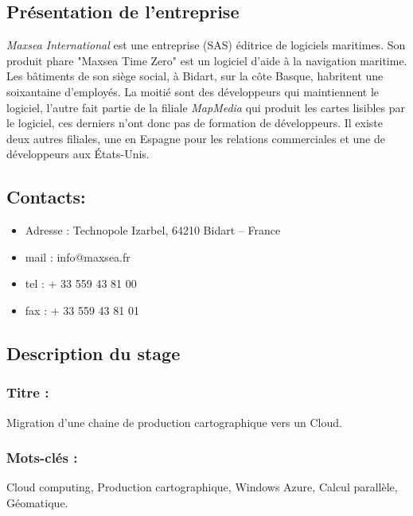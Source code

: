 
\subsection{Présentation de l'entreprise \maxsea}
\textit{Maxsea International} est une entreprise (SAS) éditrice de
logiciels maritimes. Son produit phare "Maxsea Time Zero" est un
logiciel d'aide à la navigation maritime. Les bâtiments de son siège
social, à Bidart, sur la côte Basque, habritent une soixantaine
d'employés. La moitié sont des développeurs qui maintiennent le
logiciel, l'autre fait partie de la filiale \textit{MapMedia} qui
produit les cartes lisibles par le logiciel, ces derniers n'ont donc
pas de formation de développeurs.  Il existe deux autres filiales, une
en Espagne pour les relations commerciales et une de développeurs aux
États-Unis.


\subsection{Contacts: \maxsea}

\begin{itemize}
\item Adresse : Technopole Izarbel, 64210 Bidart – France
\item mail : info@maxsea.fr
\item tel : + 33 559 43 81 00
\item fax : + 33 559 43 81 01
\end{itemize}


\subsection{Description du stage}

\subsubsection*{Titre :} 
{\centering Migration d'une chaine de production cartographique
  vers un Cloud. \\}

\subsubsection*{Mots-clés :}
{\centering Cloud computing, Production cartographique, Windows Azure,
   Calcul parallèle, Géomatique. \\}

